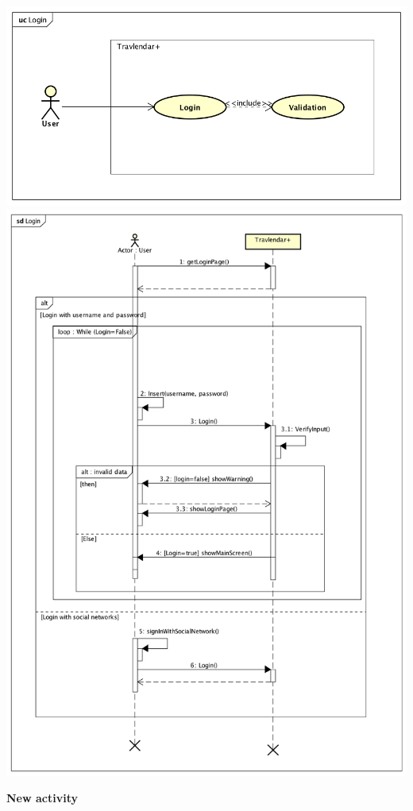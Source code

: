 \documentclass[12pt,titlepage]{article}
\begin{document}
\includegraphics[scale=0.7]{"UseCase Login"} 
\includegraphics[scale=0.55]{"SequenceDiagram Login"} 
 
\pagebreak 
\begin{flushleft}
\textbf{New activity}
\end{flushleft}
\end{document}
